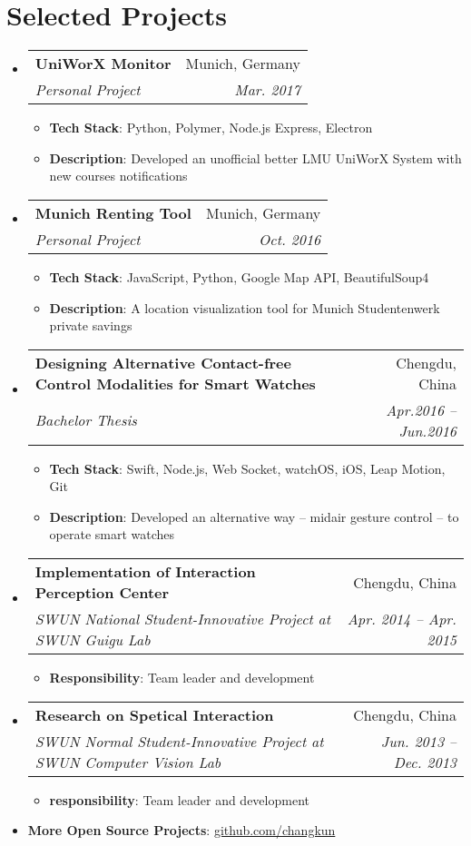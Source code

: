 \documentclass[letterpaper,11pt]{article}
\makeatletter
\newcommand{\resumeItem}[2]{
  \item\small{
    \textbf{#1}{: #2 \vspace{-2pt}}
  }
}
\newcommand{\resumeSubheading}[4]{
  \vspace{-1pt}\item
    \begin{tabular*}{0.97\textwidth}{l@{\extracolsep{\fill}}r}
      \textbf{#1} & #2 \\
      \textit{\small#3} & \textit{\small #4} \\
    \end{tabular*}\vspace{-5pt}
}
\newcommand{\resumeSubItem}[2]{\resumeItem{#1}{#2}\vspace{-4pt}}
\newcommand{\resumeSubHeadingListStart}{\begin{itemize}[leftmargin=*]}
\newcommand{\resumeSubHeadingListEnd}{\end{itemize}}
\newcommand{\resumeItemListStart}{\begin{itemize}}
\newcommand{\resumeItemListEnd}{\end{itemize}\vspace{-5pt}}
\makeatother
\begin{document}
\section{Selected Projects}
  \resumeSubHeadingListStart
    \resumeSubheading
      {UniWorX Monitor}{Munich, Germany}
      {Personal Project}{Mar. 2017}
      \resumeItemListStart
        \resumeItem{Tech Stack}
          {Python, Polymer, Node.js Express, Electron}
        \resumeItem{Description}{Developed an unofficial better LMU UniWorX System with new courses notifications}
      \resumeItemListEnd

    \resumeSubheading
      {Munich Renting Tool}{Munich, Germany}
      {Personal Project}{Oct. 2016}
      \resumeItemListStart
        \resumeItem{Tech Stack}
          {JavaScript, Python, Google Map API, BeautifulSoup4}
        \resumeItem{Description}{A location visualization tool for Munich Studentenwerk private savings}
      \resumeItemListEnd

    \resumeSubheading
      {Designing Alternative Contact-free Control Modalities for Smart Watches}{Chengdu, China}
      {Bachelor Thesis}{Apr.2016 -- Jun.2016}
      \resumeItemListStart
        \resumeItem{Tech Stack}
          {Swift, Node.js, Web Socket, watchOS, iOS, Leap Motion, Git}
        \resumeItem{Description}{Developed an alternative way -- midair gesture control -- to operate smart watches}
      \resumeItemListEnd

    \resumeSubheading
      {Implementation of Interaction Perception Center}{Chengdu, China}
      {SWUN National Student-Innovative Project at SWUN Guigu Lab}{Apr. 2014 -- Apr. 2015}
      \resumeItemListStart
        \resumeItem{Responsibility}
          {Team leader and development}
      \resumeItemListEnd

    \resumeSubheading
      {Research on Spetical Interaction}{Chengdu, China}
      {SWUN Normal Student-Innovative Project at SWUN Computer Vision Lab}{Jun. 2013 -- Dec. 2013}
      \resumeItemListStart
        \resumeItem{responsibility}
          {Team leader and development}
      \resumeItemListEnd

    \resumeSubItem{More Open Source Projects}
      {\href{https://github.com/changkun/}{github.com/changkun}}

  \resumeSubHeadingListEnd
\end{document}
